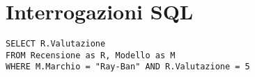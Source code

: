 \section{Interrogazioni SQL}

\begin{verbatim}
SELECT R.Valutazione
FROM Recensione as R, Modello as M
WHERE M.Marchio = "Ray-Ban" AND R.Valutazione = 5
\end{verbatim}